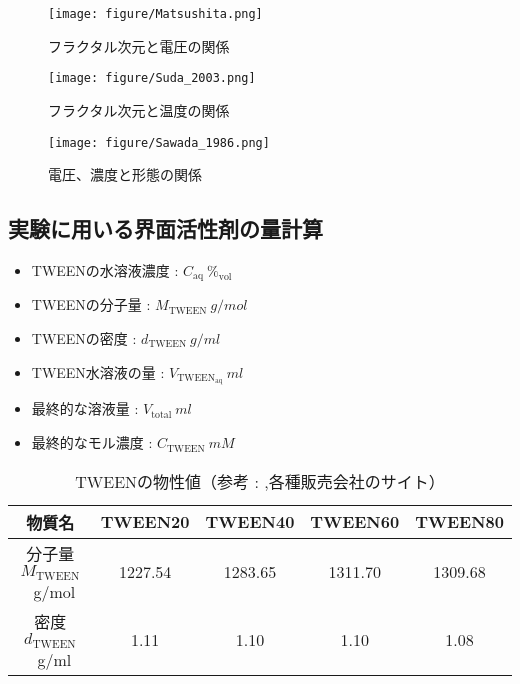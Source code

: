 \documentclass{ltjsarticle}
\begin{document}
\begin{figure}[H]
  \begin{minipage}{0.3\columnwidth}
    \centering
    \texttt{[image: figure/Matsushita.png]}
    \caption{フラクタル次元と電圧の関係\cite{matsushita1984fractal}}
    \label{fig:電圧とフラクタル次元}
  \end{minipage}
  \begin{minipage}{0.3\columnwidth}
    \centering
    \texttt{[image: figure/Suda\_2003.png]}
    \caption{フラクタル次元と温度の関係\cite{suda2003temperature}}
    \label{fig:温度とフラクタル次元}
  \end{minipage}
  \begin{minipage}{0.3\columnwidth}
    \centering
    \texttt{[image: figure/Sawada\_1986.png]}
    \caption{電圧、濃度と形態の関係\cite{sawada1986dendritic}}
    \label{fig:電圧、濃度と形態}
  \end{minipage}
\end{figure}

\subsection{実験に用いる界面活性剤の量計算}
\begin{itemize}
  \item TWEENの水溶液濃度 : $C_{\mathrm{aq}} \ \%_{\mathrm{vol}}$
  \item TWEENの分子量 : $M_{\mathrm{TWEEN}} \ \si{g/mol}$
  \item TWEENの密度 : $d_{\mathrm{TWEEN}} \ \si{g/ml}$
  \item TWEEN水溶液の量 : $V_{\mathrm{TWEEN_{aq}}} \ \si{ml}$
  \item 最終的な溶液量 : $V_{\mathrm{total}} \ \si{ml}$
  \item 最終的なモル濃度 : $C_{\mathrm{TWEEN}} \ \si{mM}$
\end{itemize}
\begin{table}[H]
  \centering
  \caption{TWEENの物性値（参考 : \cite{hait2001determination},各種販売会社のサイト）}
  \begin{tabular}{|c||c|c|c|c|}
    \hline
    物質名                                  & TWEEN20 & TWEEN40 & TWEEN60 & TWEEN80 \\
    \hline \hline
    分子量 $M_{\mathrm{TWEEN}}$\ \si{g/mol} & 1227.54 & 1283.65 & 1311.70 & 1309.68 \\
    \hline 
    密度 $d_{\mathrm{TWEEN}}$\ \si{g/ml}    & 1.11    & 1.10    & 1.10    & 1.08    \\
    \hline
  \end{tabular}
\end{table}
\end{document}
